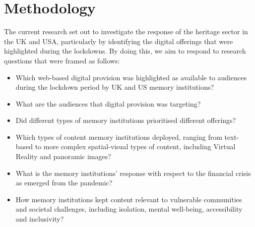 \documentclass{egpubl}
\begin{document}
\section{Methodology}
\label{meth}


The current research set out to investigate the response of the heritage sector in the UK and USA, particularly by identifying the digital offerings that were highlighted during the lockdowns. By doing this, we aim to respond to research questions that were framed as follows:

\begin{itemize}
\item Which web-based digital provision was highlighted as available to audiences during the lockdown period by UK and US memory institutions? 
\item What are the audiences that digital provision was targeting?
\item Did different types of memory institutions prioritised different offerings?
\item Which types of content memory institutions deployed, ranging from text-based to more complex spatial-visual types of content, including Virtual Reality and panoramic images?
\item What is the memory institutions' response with respect to the financial crisis as emerged from the pandemic?
\item How memory institutions kept content relevant to vulnerable communities and societal challenges, including isolation, mental well-being, accessibility and inclusivity?
\end{itemize}
\end{document}
